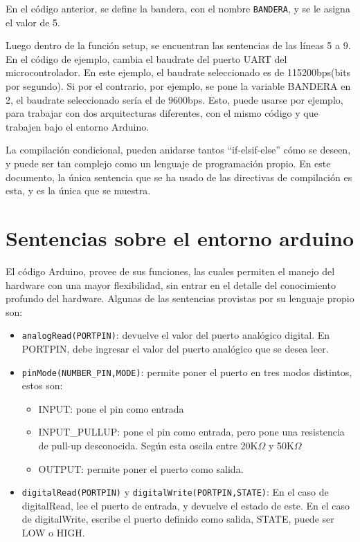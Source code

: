 En el código anterior, se define la bandera, con el nombre \texttt{BANDERA}, y se le asigna el valor de 5.  

Luego dentro de la función setup, se encuentran las sentencias de las líneas 5 a 9. En el código de ejemplo, cambia el baudrate del puerto UART del microcontrolador. En este ejemplo, el baudrate seleccionado es de 115200bps(bits por segundo). Si por el contrario, por ejemplo, se pone la variable BANDERA en 2, el baudrate seleccionado sería el de 9600bps. Esto, puede usarse por ejemplo, para trabajar con dos arquitecturas diferentes, con el mismo código y que trabajen bajo el entorno Arduino.     
 
La compilación condicional, pueden anidarse tantos ``if-elsif-else'' cómo se deseen, y puede ser tan complejo como un lenguaje de programación propio. En este documento, la única sentencia que se ha usado de las directivas de compilación es esta, y es la única que se muestra.   




\section{Sentencias sobre el entorno arduino}

El código Arduino, provee de sus funciones, las cuales permiten el manejo del hardware con una mayor flexibilidad, sin entrar en el detalle del conocimiento profundo del hardware. Algunas de las sentencias provistas por su lenguaje propio son: 
\begin{itemize}
	\item \texttt{analogRead(PORTPIN)}: devuelve el valor del puerto analógico digital. En PORTPIN, debe ingresar el valor del puerto analógico que se desea leer. 
	\item \texttt{pinMode(NUMBER\_PIN,MODE)}: permite poner el puerto en tres modos distintos, estos son: 
		\begin{itemize}
			\item INPUT: pone el pin como entrada
 			\item INPUT\_PULLUP: pone el pin como entrada, pero pone una resistencia de pull-up desconocida. Según \cite{ATmega328P} esta oscila entre 20K$\Omega$ y 50K$\Omega$ 
			\item OUTPUT: permite poner el puerto como salida. 
		\end{itemize}
	\item \texttt{digitalRead(PORTPIN)} y \texttt{digitalWrite(PORTPIN,STATE)}: En el caso de digitalRead, lee el puerto de entrada, y devuelve el estado de este. En el caso de digitalWrite, escribe el puerto definido como salida, STATE, puede ser LOW o HIGH.   
\end{itemize}

